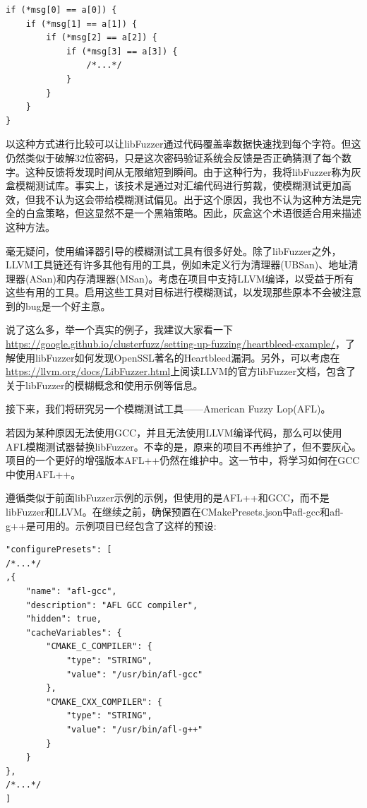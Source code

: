 \begin{lstlisting}[style=styleCXX]
if (*msg[0] == a[0]) {
	if (*msg[1] == a[1]) {
		if (*msg[2] == a[2]) {
			if (*msg[3] == a[3]) {
				/*...*/
			}
		}
	}
}
\end{lstlisting}

以这种方式进行比较可以让libFuzzer通过代码覆盖率数据快速找到每个字符。但这仍然类似于破解32位密码，只是这次密码验证系统会反馈是否正确猜测了每个数字。这种反馈将发现时间从无限缩短到瞬间。由于这种行为，我将libFuzzer称为灰盒模糊测试库。事实上，该技术是通过对汇编代码进行剪裁，使模糊测试更加高效，但我不认为这会带给模糊测试偏见。出于这个原因，我也不认为这种方法是完全的白盒策略，但这显然不是一个黑箱策略。因此，灰盒这个术语很适合用来描述这种方法。 

毫无疑问，使用编译器引导的模糊测试工具有很多好处。除了libFuzzer之外，LLVM工具链还有许多其他有用的工具，例如未定义行为清理器(UBSan)、地址清理器(ASan)和内存清理器(MSan)。考虑在项目中支持LLVM编译，以受益于所有这些有用的工具。启用这些工具对目标进行模糊测试，以发现那些原本不会被注意到的bug是一个好主意。

说了这么多，举一个真实的例子，我建议大家看一下\url{https://google.github.io/clusterfuzz/setting-up-fuzzing/heartbleed-example/}，了解使用libFuzzer如何发现OpenSSL著名的Heartbleed漏洞。另外，可以考虑在\url{https://llvm.org/docs/LibFuzzer.html}上阅读LLVM的官方libFuzzer文档，包含了关于libFuzzer的模糊概念和使用示例等信息。

接下来，我们将研究另一个模糊测试工具——American Fuzzy Lop(AFL)。


若因为某种原因无法使用GCC，并且无法使用LLVM编译代码，那么可以使用AFL模糊测试器替换libFuzzer。不幸的是，原来的项目不再维护了，但不要灰心。项目的一个更好的增强版本AFL++仍然在维护中。这一节中，将学习如何在GCC中使用AFL++。

遵循类似于前面libFuzzer示例的示例，但使用的是AFL++和GCC，而不是libFuzzer和LLVM。在继续之前，确保预置在CMakePresets.json中afl-gcc和afl-g++是可用的。示例项目已经包含了这样的预设:

\begin{lstlisting}[style=styleCMake]
"configurePresets": [
/*...*/
,{
	"name": "afl-gcc",
	"description": "AFL GCC compiler",
	"hidden": true,
	"cacheVariables": {
		"CMAKE_C_COMPILER": {
			"type": "STRING",
			"value": "/usr/bin/afl-gcc"
		},
		"CMAKE_CXX_COMPILER": {
			"type": "STRING",
			"value": "/usr/bin/afl-g++"
		}
	}
},
/*...*/
]
\end{lstlisting}

